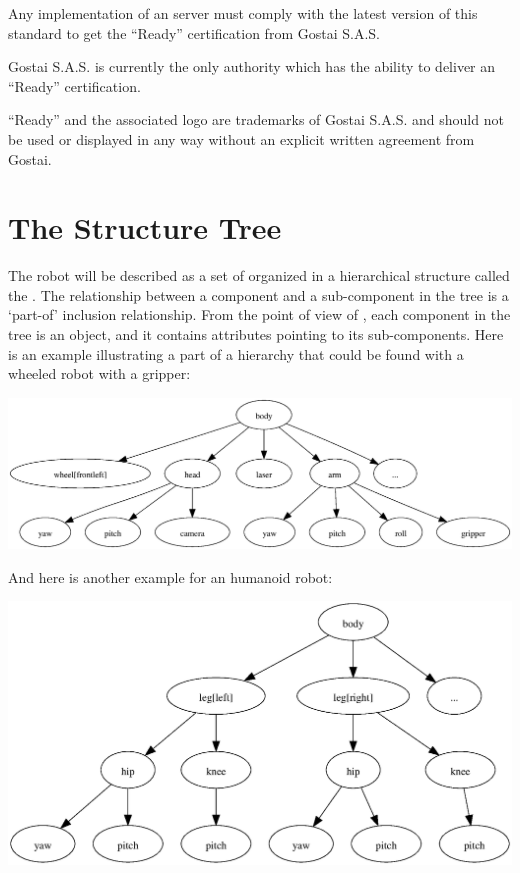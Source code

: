 \begin{center}
\end{center}

Any implementation of an \urbi server must comply with the latest
version of this standard to get the ``\urbi Ready'' certification from
Gostai S.A.S.

Gostai S.A.S. is currently the only authority which has the ability to
deliver an ``\urbi Ready'' certification.

``\urbi Ready'' and the associated logo are trademarks of Gostai
S.A.S. and should not be used or displayed in any way without an
explicit written agreement from Gostai.

\section{The Structure Tree}

The robot will be described as a set of  organized
in a hierarchical structure called the . The
relationship between a component and a sub-component in the tree is a
`part-of' inclusion relationship. From the point of view of \urbi,
each component in the tree is an object, and it contains attributes
pointing to its sub-components. Here is an example illustrating a part
of a hierarchy that could be found with a wheeled robot with a gripper:

\begin{center}
  \includegraphics[width=.8\linewidth]{img/structure-tree-wheeled}
\end{center}

And here is another example for an humanoid robot:

\begin{center}
  \includegraphics[width=.8\linewidth]{img/structure-tree-humanoid}
\end{center}

